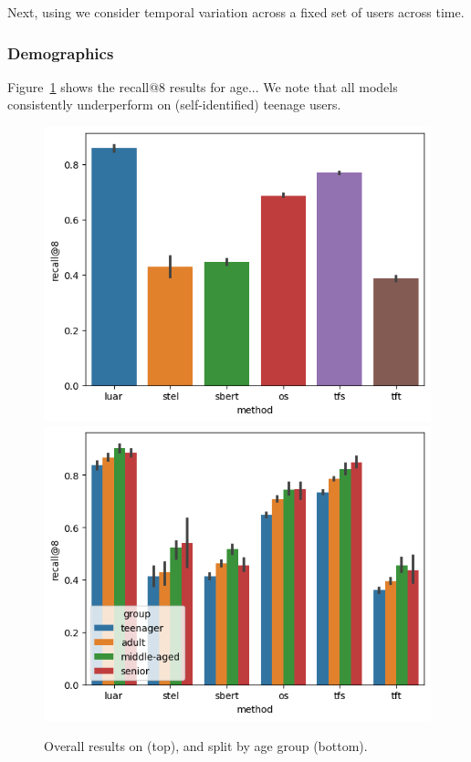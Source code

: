 Next, using \DSvarydelta{} we consider temporal variation across a fixed set of users across time.

\subsubsection{Demographics}
Figure~\ref{fig:demographic_fixed:age} shows the recall@8 results for age... 
We note that all models consistently underperform on (self-identified) teenage users.

\begin{figure}[h]
    \centering
    \includegraphics[width=0.48\linewidth]{stylometryExtensions/figures/demo/fixeddelta_demographics_age.png}
    \includegraphics[width=0.48\linewidth]{stylometryExtensions/figures/demo/fixeddelta_demographics_age_groupwise.png}
    \caption{Overall results on \DSagefixed{} (top), and split by age group (bottom). }
    \label{fig:demographic_fixed:age}
\end{figure}

